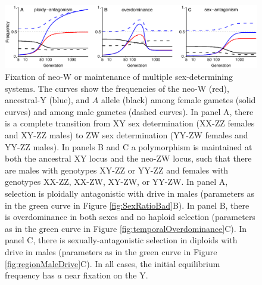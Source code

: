 \documentclass[12pt]{article}
\begin{document}
\begin{figure}[!h]
\centering
\centerline{
\includegraphics[width=\linewidth]{Freq_plot_combined_PloidAntag.eps}
}
\caption{
Fixation of neo-W or maintenance of multiple sex-determining systems. 
The curves show the frequencies of the neo-W (red), ancestral-Y (blue), and $A$ allele (black) among female gametes (solid curves) and among male gametes (dashed curves). 
In panel A, there is a complete transition from XY sex determination (XX-ZZ females and XY-ZZ males) to ZW sex determination (YY-ZW females and YY-ZZ males).  
In panels B and C a polymorphism is maintained at both the ancestral XY locus and the neo-ZW locus, such that there are males with genotypes XY-ZZ or YY-ZZ and females with genotypes XX-ZZ, XX-ZW, XY-ZW, or YY-ZW. 
In panel A, selection is ploidally antagonistic with drive in males (parameters as in the green curve in Figure \ref{fig:SexRatioBad}B).
In panel B, there is overdominance in both sexes and no haploid selection (parameters as in the green curve in Figure \ref{fig:temporalOverdominance}C).
In panel C, there is sexually-antagonistic selection in diploids with drive in males (parameters as in the green curve in Figure \ref{fig:regionMaleDrive}C).
In all cases, the initial equilibrium frequency has $a$ near fixation on the Y.
}
\label{fig:freqAll}
\end{figure}
\end{document}
